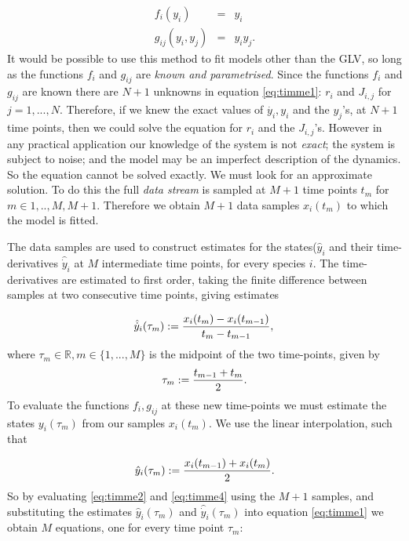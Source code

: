 \begin{eqnarray}
f_i(y_i) &=& y_i \\
g_{ij}(y_i,y_j) &=& y_iy_j.
\end{eqnarray}
%
It would be possible to use this method to fit models other than the GLV, so long as the functions $f_i$ and $g_{ij}$ are \emph{known and parametrised}. Since the functions $f_i$ and $g_{ij}$ are known there are $N+1$ unknowns in equation \eqref{eq:timme1}: $r_i$ and $J_{i,j}$ for $j=1,...,N$. Therefore, if we knew the exact values of $\dot{y_i},y_i$ and the $y_j$'s, at $N+1$ time points, then we could solve the equation for $r_i$ and the $J_{i,j}$'s. However in any practical application our knowledge of the system is not \emph{exact}; the system is subject to noise; and the model may be an imperfect description of the dynamics. So the equation cannot be solved exactly. We must look for an approximate solution. To do this the full \emph{data stream} is sampled at $M+1$ time points $t_m$ for $m \in {1,..,M,M+1}$. Therefore we obtain $M+1$ data samples $x_i(t_m)$ to which the model is fitted. 

The data samples are used to construct estimates for the states($\hat{y}_i$ and their time-derivatives $\hat{\dot{y}}_i$ at $M$ intermediate time points, for every species $i$. The time-derivatives are estimated to first order, taking the finite difference between samples at two consecutive time points, giving estimates

\begin{equation}\label{eq:timme2}
\hat{\dot{y}}_{i}(\tau_m) := \frac{x_i(t_m) - x_i(t_{m-1})}{t_m - t_{m-1}},\\
\end{equation}
%
where $\tau_m \in{\mathbb{R}}, m \in{\{1,...,M\}}$ is the midpoint of the two time-points, given by
%
\begin{equation}\label{eq:timme3}
\tau_m := \frac{t_{m-1} + t_{m}}{2}.\\
\end{equation}
%
To evaluate the functions $f_i, g_{ij}$ at these new time-points we must estimate the states $y_i(\tau_m)$ from our samples $x_i(t_m)$. We use the linear interpolation, such that

\begin{equation}\label{eq:timme4}
\hat{y}_{i}(\tau_m) := \frac{x_i(t_{m-1}) + x_i(t_{m})}{2}.\\
\end{equation}
%
So by evaluating \eqref{eq:timme2} and \eqref{eq:timme4} using the $M+1$ samples, and substituting the estimates $\hat{y}_i(\tau_m)$ and $\hat{\dot{y}}_i(\tau_m)$ into equation \ref{eq:timme1} we obtain $M$ equations, one for every time point $\tau_m$:

